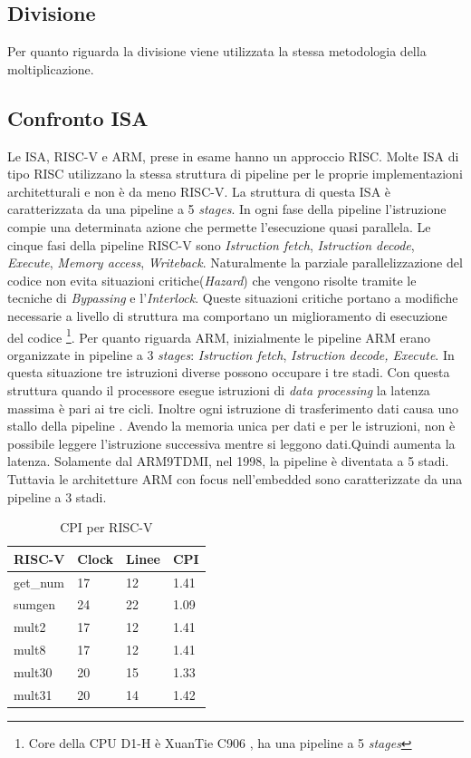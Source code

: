 \documentclass[12pt, a4paper]{report}
\begin{document}
\vspace{2cm}

\subsection{Divisione}
Per quanto riguarda la divisione viene utilizzata la stessa metodologia della moltiplicazione.

\subsection{Confronto ISA}
Le ISA, RISC-V e ARM, prese in esame hanno un approccio RISC. 
Molte ISA di tipo RISC utilizzano la stessa struttura di pipeline per le proprie implementazioni architetturali e non è da meno RISC-V. La struttura di questa ISA è caratterizzata da una pipeline a 5 \textit{stages}. In ogni fase della pipeline l'istruzione compie una determinata azione che permette l'esecuzione quasi parallela. 
Le cinque fasi della pipeline RISC-V sono \textit{Istruction fetch}, \textit{Istruction decode}, \textit{Execute}, \textit{Memory access}, \textit{Writeback}. %
Naturalmente la parziale parallelizzazione del codice non evita situazioni critiche(\textit{Hazard}) che vengono risolte tramite le tecniche di \textit{Bypassing} e l'\textit{Interlock}. Queste situazioni critiche portano a modifiche necessarie a livello di struttura ma comportano un miglioramento di esecuzione del codice \footnote{Core della CPU D1-H è XuanTie C906 \cite{DocH1}, ha una pipeline a 5 \textit{stages}}. 
Per quanto riguarda ARM, inizialmente le pipeline ARM erano organizzate in pipeline a 3 \textit{stages}: \textit{Istruction fetch}, \textit{Istruction decode, Execute}. In questa situazione tre istruzioni diverse possono occupare i tre stadi.  Con questa struttura quando il processore esegue istruzioni di \textit{data processing} la latenza massima è pari ai tre cicli. Inoltre ogni istruzione di trasferimento dati causa uno stallo della pipeline \cite{3stagesPipeline}. Avendo la memoria unica per dati e per le istruzioni, non è possibile leggere l'istruzione successiva mentre si leggono dati.Quindi aumenta la latenza. Solamente dal ARM9TDMI, nel 1998, la pipeline è diventata a 5 stadi. Tuttavia le architetture ARM con focus nell'embedded sono caratterizzate da una pipeline a 3 stadi. 


\begin{table}[ht]
\centering
\begin{tabular}{|l|l|l|l|}
\hline
RISC-V   & Clock & Linee & CPI  \\ \hline
get\_num & 17    & 12    & 1.41 \\ \hline
sumgen   & 24    & 22    & 1.09 \\ \hline
mult2    & 17    & 12    & 1.41 \\ \hline
mult8    & 17    & 12    & 1.41 \\ \hline
mult30   & 20    & 15    & 1.33 \\ \hline
mult31   & 20    & 14    & 1.42 \\ \hline
\end{tabular}
\caption{CPI per RISC-V}
\label{tab:CPI_RISCV}
\end{table}
\end{document}
